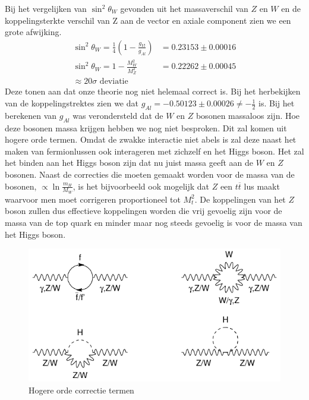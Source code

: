 \documentclass[../main.tex]{subfiles}
\begin{document}
Bij het vergelijken van $\sin^2\theta_W$ gevonden uit het massaverschil van $Z$ en $W$ en de koppelingsterkte verschil van Z aan de vector en axiale component zien we een grote afwijking.
\begin{equation}
    \begin{aligned}
        \label{eq:vergelijken_weignberg_res}
        \sin^2\theta_W = \frac{1}{4}  \left( 1 - \frac{g_{Vl}}{g_{Al}} \right) &= 0.23153 \pm 0.00016\\
        \sin^2\theta_W = 1 - \frac{M_W^2}{M_Z^2} &= 0.22262 \pm 0.00045\\
        \approx 20\sigma \text{ deviatie}
    \end{aligned}
\end{equation}
Deze tonen aan dat onze theorie nog niet helemaal correct is. Bij het herbekijken van de koppelingstrektes zien we dat $g_{Al} = -0.50123 \pm 0.00026 \neq -\frac{1}{2}$ is. Bij het berekenen van $g_{Al}$ was verondersteld dat de $W$ en $Z$ bosonen massaloos zijn. Hoe deze bosonen massa krijgen hebben we nog niet besproken. Dit zal komen uit hogere orde termen. Omdat de zwakke interactie niet abels is zal deze naast het maken van fermionlussen ook interageren met zichzelf en het Higgs boson. Het zal het binden aan het Higgs boson zijn dat nu juist massa geeft aan de $W$ en $Z$ bosonen. Naast de correcties die moeten gemaakt worden voor de massa van de bosonen, $\propto \ln \frac{m_H}{M_W}$, is het bijvoorbeeld ook mogelijk dat $Z$ een $t\overline t$ lus maakt waarvoor men moet corrigeren proportioneel tot $M_t^2$. De koppelingen van het $Z$ boson zullen dus effectieve koppelingen worden die vrij gevoelig zijn voor de massa van de top quark en minder maar nog steeds gevoelig is voor de massa van het Higgs boson.

\begin{figure}[h]
    \centering
    \includegraphics[width=0.6\linewidth]{elektroweak_precision_tests/hogere_orde_w.png}
    \caption{Hogere orde correctie termen}%
    \label{fig:elektroweak_precision_tests/hogere_orde_w}
\end{figure}
\end{document}
